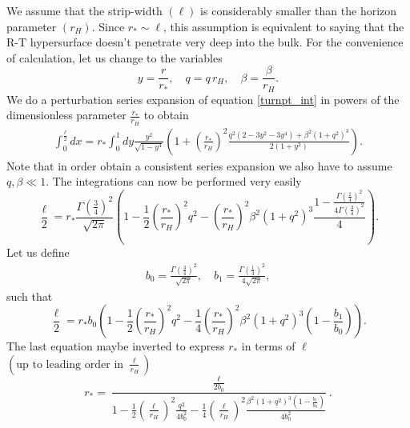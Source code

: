 \documentclass[12pt,a4paper]{article}
\numberwithin{equation}{section}
\begin{document}
We assume that the strip-width $\left(\ell\right)$ is considerably smaller than the horizon parameter $\left(r_H\right)$. Since $r_{\ast}\sim\ell$, this assumption is equivalent to saying that the R-T hypersurface doesn't penetrate very deep into the bulk. For the convenience of calculation, let us change to the variables\[y = \frac{r}{r_{\ast}}, \quad q = q\,r_H, \quad \beta = \frac{\beta}{r_H}.\] We do a perturbation series expansion of equation \eqref{turnpt_int} in powers of the dimensionless parameter $\frac{r_{\ast}}{r_H}$ to obtain
%
\begin{equation}
	\begin{split}
	\int_{0}^{\frac{\ell}{2}} dx = r_{\ast} \int_{0}^{1} dy \frac{y^2}{\sqrt{1-y^4}} \left( 1 + \left(\frac{r_*}{r_H}\right)^2 \frac{q^2 \left( 2 - 3 y^2 - 3 y^4 \right) + \beta^2 \left( 1 + q^2 \right)^3}{2 \left(1+y^2\right)} \right).
	\end{split}
\end{equation}
%
Note that in order obtain a consistent series expansion we also have to assume $ q, \beta \ll 1$. The integrations can now be performed very easily
%
\begin{equation}
	\frac{\ell}{2} = r_{\ast} \frac{\Gamma\left(\frac{3}{4}\right)^2}{\sqrt{2 \pi}} \left( 1 - \frac{1}{2} \left( \frac{r_*}{r_H} \right)^2 q^2 - \left( \frac{r_*}{r_H} \right)^2 \beta^2 \left(1 + q^2\right)^3 \frac{1 - \frac{\Gamma\left(\frac{1}{4}\right)^2}{4 \Gamma\left(\frac{3}{4}\right)^2}}{4} \right).
\end{equation}
%
Let us define 
%
\begin{align} \label{constant_defn}
    b_0 = \frac{\Gamma\left(\frac{3}{4}\right)^2}{\sqrt{2 \pi}}, \quad b_1 = \frac{\Gamma\left(\frac{1}{4}\right)^2}{4 \sqrt{2\pi}},
\end{align}
%
such that
%
\begin{equation}
    \frac{\ell}{2} = r_{\ast} b_0 \left( 1 - \frac{1}{2} \left( \frac{r_*}{r_H} \right)^2 q^2 - \frac{1}{4} \left( \frac{r_*}{r_H} \right)^2 \beta^2 \left(1 + q^2\right)^3 \left(1 - \frac{b_1}{b_0} \right) \right).
\end{equation}
%
The last equation maybe inverted to express $r_*$ in terms of $\ell$ $\left(\text{up to leading order in }\frac{\ell}{r_H}\right)$
%
\begin{equation} \label{turnpt_exp}
	r_* = \frac{\frac{\ell}{2 b_0}}{1 - \frac{1}{2}\left(\frac{\ell}{r_H}\right)^2 \frac{q^2}{4 b_0^2} - \frac{1}{4} \left(\frac{\ell}{r_H}\right)^2 \frac{\beta^2 \left(1 + q^2 \right)^3 \left( 1 - \frac{b_1}{b_0} \right)}{4 b_0^2} }.
\end{equation}
\end{document}
